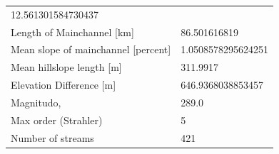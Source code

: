 \documentclass[11pt,]{article}
\begin{document}
\begin{longtable}[]{@{}ll@{}}
\begin{minipage}[t]{0.28\columnwidth}
12.561301584730437\strut
\end{minipage}\tabularnewline
\begin{minipage}[t]{0.66\columnwidth}\raggedright\strut
Length of Mainchannel {[}km{]}\strut
\end{minipage} & \begin{minipage}[t]{0.28\columnwidth}\raggedright\strut
86.501616819\strut
\end{minipage}\tabularnewline
\begin{minipage}[t]{0.66\columnwidth}\raggedright\strut
Mean slope of mainchannel {[}percent{]}\strut
\end{minipage} & \begin{minipage}[t]{0.28\columnwidth}\raggedright\strut
1.0508578295624251\strut
\end{minipage}\tabularnewline
\begin{minipage}[t]{0.66\columnwidth}\raggedright\strut
Mean hillslope length {[}m{]}\strut
\end{minipage} & \begin{minipage}[t]{0.28\columnwidth}\raggedright\strut
311.9917\strut
\end{minipage}\tabularnewline
\begin{minipage}[t]{0.66\columnwidth}\raggedright\strut
Elevation Difference {[}m{]}\strut
\end{minipage} & \begin{minipage}[t]{0.28\columnwidth}\raggedright\strut
646.9368038853457\strut
\end{minipage}\tabularnewline
\begin{minipage}[t]{0.66\columnwidth}\raggedright\strut
Magnitudo,\strut
\end{minipage} & \begin{minipage}[t]{0.28\columnwidth}\raggedright\strut
289.0\strut
\end{minipage}\tabularnewline
\begin{minipage}[t]{0.66\columnwidth}\raggedright\strut
Max order (Strahler)\strut
\end{minipage} & \begin{minipage}[t]{0.28\columnwidth}\raggedright\strut
5\strut
\end{minipage}\tabularnewline
\begin{minipage}[t]{0.66\columnwidth}\raggedright\strut
Number of streams\strut
\end{minipage} & \begin{minipage}[t]{0.28\columnwidth}\raggedright\strut
421\strut
\end{minipage}\tabularnewline

\end{longtable}
\end{document}
